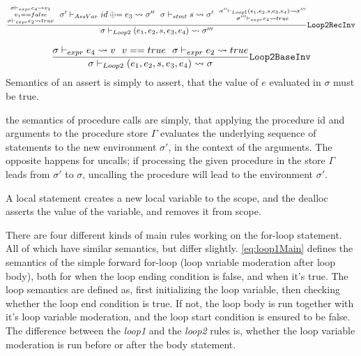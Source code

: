 \begin{equation} \label{eq:loop2RecInv}
    \frac{\substack{\sigma \vdash_{expr} e_4 \leadsto v_1 \\
            v_1 == false \\
            \sigma \vdash_{expr} e_2 \leadsto true} ~~
        \sigma' \vdash_{AssVar} id \oplus{\kern-5.0pt}= e_3 \leadsto \sigma'' ~~
        \sigma \vdash_{stmt} s \leadsto \sigma' ~~
        \substack{\sigma'' \vdash_{Loop1} (e_1, e_2, s, e_3, e_4) \leadsto \sigma''' \\
            \sigma''' \vdash_{expr} e_2 \leadsto true}}
    {\sigma \vdash_{Loop2} (e_1, e_2, s, e_3, e_4) \leadsto \sigma'''}
    \text{\texttt{Loop2RecInv}}
\end{equation}

\begin{equation} \label{eq:loop2BaseInv}
    \frac{\sigma \vdash_{expr} e_4 \leadsto v ~~
        v == true ~~
        \sigma \vdash_{expr} e_2 \leadsto true}
    {\sigma \vdash_{Loop2} (e_1, e_2, s, e_3, e_4) \leadsto \sigma}
    \text{\texttt{Loop2BaseInv}}
\end{equation}
\noindent
Semantics of an assert is simply to assert, that the value of $e$ evaluated in $\sigma$ must
be true.

the semantics of procedure calls are simply, that applying the procedure id and arguments to the
procedure store $\Gamma$ evaluates the underlying sequence of statements to the new environment
$\sigma'$, in the context of the arguments.
The opposite happens for uncalls; if processing the given procedure in the store $\Gamma$ leads
from $\sigma'$ to $\sigma$, uncalling the procedure will lead to the environment $\sigma'$.

A local statement creates a new local variable to the scope, and
the dealloc asserts the value of the variable, and removes it from scope.

There are four different kinds of main rules working on the for-loop statement. All of which
have similar semantics, but differ slightly.
\eqref{eq:loop1Main} defines the semantics of the simple
forward for-loop (loop variable moderation after loop body), both for when the loop ending
condition is false, and when it's true. The loop semantics are defined as, first initializing
the loop variable, then checking whether the loop end condition is true. If not, the loop body
is run together with it's loop variable moderation, and the loop start condition is ensured to
be false. The difference between the \emph{loop1} and the \emph{loop2} rules is, whether
the loop variable moderation is run before or after the body statement.

